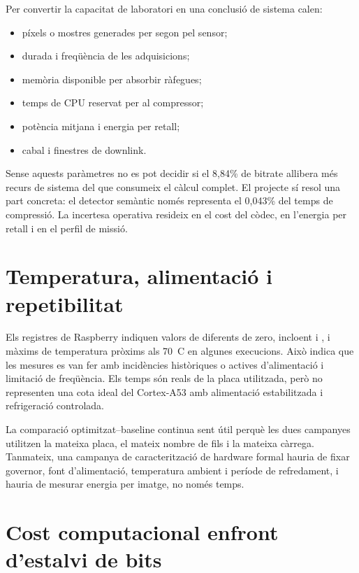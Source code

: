 Per convertir la capacitat de laboratori en una conclusió de sistema calen:

\begin{itemize}[leftmargin=*]
  \item píxels o mostres generades per segon pel sensor;
  \item durada i freqüència de les adquisicions;
  \item memòria disponible per absorbir ràfegues;
  \item temps de CPU reservat per al compressor;
  \item potència mitjana i energia per retall;
  \item cabal i finestres de downlink.
\end{itemize}

Sense aquests paràmetres no es pot decidir si el 8,84\% de bitrate allibera més
recurs de sistema del que consumeix el càlcul complet. El projecte sí resol una
part concreta: el detector semàntic només representa el 0,043\% del temps de
compressió. La incertesa operativa resideix en el cost del còdec, en l'energia
per retall i en el perfil de missió.

\section{Temperatura, alimentació i repetibilitat}\label{sec:thermal}

Els registres de Raspberry indiquen valors de  diferents
de zero, incloent  i , i màxims de temperatura pròxims als
70~\textdegree C en algunes execucions. Això indica que les mesures es van fer
amb incidències històriques o actives d'alimentació i limitació de freqüència.
Els temps són reals de la placa utilitzada, però no representen una cota ideal
del Cortex-A53 amb alimentació estabilitzada i refrigeració controlada.

La comparació optimitzat--baseline continua sent útil perquè les dues campanyes
utilitzen la mateixa placa, el mateix nombre de fils i la mateixa càrrega.
Tanmateix, una campanya de caracterització de hardware formal hauria de fixar
governor, font d'alimentació, temperatura ambient i període de refredament, i
hauria de mesurar energia per imatge, no només temps.

\section{Cost computacional enfront d'estalvi de bits}\label{sec:cost_benefit}

